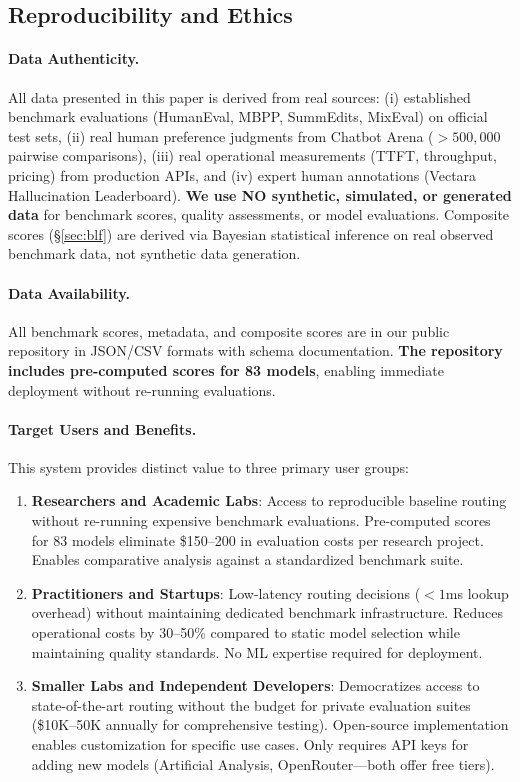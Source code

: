 \subsection{Reproducibility and Ethics}

\paragraph{Data Authenticity.}
All data presented in this paper is derived from real sources: (i) established benchmark evaluations (HumanEval, MBPP, SummEdits, MixEval) on official test sets, (ii) real human preference judgments from Chatbot Arena ($>500{,}000$ pairwise comparisons), (iii) real operational measurements (TTFT, throughput, pricing) from production APIs, and (iv) expert human annotations (Vectara Hallucination Leaderboard). \textbf{We use NO synthetic, simulated, or generated data} for benchmark scores, quality assessments, or model evaluations. Composite scores (§\ref{sec:blf}) are derived via Bayesian statistical inference on real observed benchmark data, not synthetic data generation.

\paragraph{Data Availability.}
All benchmark scores, metadata, and composite scores are in our public repository in JSON/CSV formats with schema documentation. \textbf{The repository includes pre-computed scores for 83 models}, enabling immediate deployment without re-running evaluations.

\paragraph{Target Users and Benefits.}
This system provides distinct value to three primary user groups:

\begin{enumerate}[topsep=2pt,itemsep=2pt]
    \item \textbf{Researchers and Academic Labs}: Access to reproducible baseline routing without re-running expensive benchmark evaluations. Pre-computed scores for 83 models eliminate \$150--200 in evaluation costs per research project. Enables comparative analysis against a standardized benchmark suite.
    
    \item \textbf{Practitioners and Startups}: Low-latency routing decisions ($<1$ms lookup overhead) without maintaining dedicated benchmark infrastructure. Reduces operational costs by 30--50\% compared to static model selection while maintaining quality standards. No ML expertise required for deployment.
    
    \item \textbf{Smaller Labs and Independent Developers}: Democratizes access to state-of-the-art routing without the budget for private evaluation suites (\$10K--50K annually for comprehensive testing). Open-source implementation enables customization for specific use cases. Only requires API keys for adding new models (Artificial Analysis, OpenRouter---both offer free tiers).
\end{enumerate}

